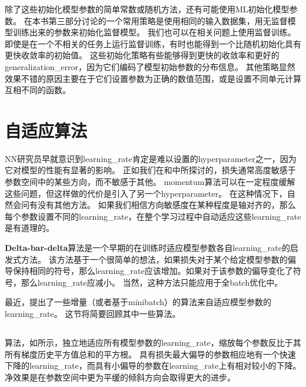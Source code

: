 除了这些初始化模型参数的简单常数或随机方法，还有可能使用\gls{ML}初始化模型参数。
在本书第三部分讨论的一个常用策略是使用相同的输入数据集，用无监督模型训练出来的参数来初始化监督模型。
我们也可以在相关问题上使用监督训练。
即使是在一个不相关的任务上运行监督训练，有时也能得到一个比随机初始化具有更快收敛率的初始值。
这些初始化策略有些能够得到更快的收敛率和更好的\gls{generalization_error}，因为它们编码了模型初始参数的分布信息。
其他策略显然效果不错的原因主要在于它们设置参数为正确的数值范围，或是设置不同单元计算互相不同的函数。


\section{自适应算法}
\label{sec:algorithms_with_adaptive_learning_rates}
\gls{NN}研究员早就意识到\gls{learning_rate}肯定是难以设置的\gls{hyperparameter}之一，因为它对模型的性能有显著的影响。
正如我们在和中所探讨的，损失通常高度敏感于参数空间中的某些方向，而不敏感于其他。
\gls{momentum}算法可以在一定程度缓解这些问题，但这样做的代价是引入了另一个\gls{hyperparameter}。
在这种情况下，自然会问有没有其他方法。
如果我们相信方向敏感度在某种程度是轴对齐的，那么每个参数设置不同的\gls{learning_rate}，在整个学习过程中自动适应这些\gls{learning_rate}是有道理的。



\textbf{Delta-bar-delta}算法\citep{jacobs1988}是一个早期的在训练时适应模型参数各自\gls{learning_rate}的启发式方法。
该方法基于一个很简单的想法，如果损失对于某个给定模型参数的偏导保持相同的符号，那么\gls{learning_rate}应该增加。如果对于该参数的偏导变化了符号，那么\gls{learning_rate}应减小。
当然，这种方法只能应用于全\gls{batch}优化中。


最近，提出了一些增量（或者基于\gls{minibatch}）的算法来自适应模型参数的\gls{learning_rate}。
这节将简要回顾其中一些算法。


\subsection{}
\label{sec:adagrad}
算法，如所示，独立地适应所有模型参数的\gls{learning_rate}，缩放每个参数反比于其所有梯度历史平方值总和的平方根\citep{Duchi+al-2011}。
具有损失最大偏导的参数相应地有一个快速下降的\gls{learning_rate}，而具有小偏导的参数在\gls{learning_rate}上有相对较小的下降。
净效果是在参数空间中更为平缓的倾斜方向会取得更大的进步。


